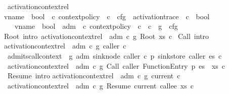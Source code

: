 \begin{isabelle}
\ activation\isacharunderscore{}context\isacharunderscore{}rel\ \isacharcolon{}\isacharcolon{}\isanewline
\isaindent{\ \ }\isachardoublequote{}\isacharparenleft{}vname\ {\isasymRightarrow}\ bool\isacharparenright{}\ {\isasymRightarrow}\ \isacharprime{}c\ context\isacharunderscore{}policy\ {\isasymRightarrow}\ \isacharprime{}c\ {\isasymRightarrow}\ cfg\ {\isasymRightarrow}\ activation\isacharunderscore{}trace\ {\isasymRightarrow}\ \isacharprime{}c\ {\isasymRightarrow}\ bool\isachardoublequote{}\isanewline
\isaindent{\ \ }\ {\isasymG}\ \isacharcolon{}\isacharcolon{}\ \isachardoublequote{}vname\ {\isasymRightarrow}\ bool\isachardoublequote{}\ \ adm\ \isacharcolon{}\isacharcolon{}\ \isachardoublequote{}\isacharprime{}c\ context\isacharunderscore{}policy\isachardoublequote{}\ \ c\ \isacharcolon{}\isacharcolon{}\ \isacharprime{}c\ \ g\ \isacharcolon{}\isacharcolon{}\ cfg\isanewline
{}\isanewline
\isaindent{\ \ }Root\ \isacharbrackleft{}intro\isacharbrackright{}\isacharcolon{}\ \isachardoublequote{}activation\isacharunderscore{}context\isacharunderscore{}rel\ {\isasymG}\ adm\ c\ g\ \isacharparenleft{}Root\ xs\isacharparenright{}\ c\isachardoublequote{}\isanewline
\isacharbar{}\ Call\ \isacharbrackleft{}intro\isacharbrackright{}\isacharcolon{}\isanewline
\isaindent{\ \ \ \ }\isachardoublequote{}activation\isacharunderscore{}context\isacharunderscore{}rel\ {\isasymG}\ adm\ c\ g\ caller\ c\isanewline
\isaindent{\ \ \ \ \ }{\isasymLongrightarrow}\ admits\isacharunderscore{}call\isacharunderscore{}context\ {\isasymG}\ g\ adm\ \isacharparenleft{}sink\isacharunderscore{}node\ caller\isacharparenright{}\ c\ p\ \isacharparenleft{}sink\isacharunderscore{}store\ caller\isacharparenright{}\ es\ c\isacharprime{}\isanewline
\isaindent{\ \ \ \ \ }{\isasymLongrightarrow}\ activation\isacharunderscore{}context\isacharunderscore{}rel\ {\isasymG}\ adm\ c\ g\ \isacharparenleft{}Call\ caller\ \isacharparenleft{}\isacharparenleft{}FunctionEntry\ p\isacharcomma{}\ es\isacharparenright{}\ \isacharhash{}\ xs\isacharparenright{}\isacharparenright{}\ c\isacharprime{}\isachardoublequote{}\isanewline
\isacharbar{}\ Resume\ \isacharbrackleft{}intro\isacharbrackright{}\isacharcolon{}\isanewline
\isaindent{\ \ \ \ }\isachardoublequote{}activation\isacharunderscore{}context\isacharunderscore{}rel\ {\isasymG}\ adm\ c\ g\ current\ c\isanewline
\isaindent{\ \ \ \ \ }{\isasymLongrightarrow}\ activation\isacharunderscore{}context\isacharunderscore{}rel\ {\isasymG}\ adm\ c\ g\ \isacharparenleft{}Resume\ current\ callee\ xs\isacharparenright{}\ c\isachardoublequote{}
\end{isabelle}
